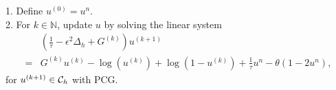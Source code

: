 \begin{algorithm}[!t]
    \caption{Iterative solver based on high-dimensional Newton's method}
\label{alg:Newton}
    \raggedright
    1. Define $u^{(0)}=u^n$.\\
    2. For $k\in\mathbb{N}$, update $u$ by solving the linear system
    \begin{equation}
\begin{aligned}
    &(\frac{1}{\tau}-\epsilon^2\Delta_h+G^{(k)})u^{(k+1)}\\
    =&G^{(k)}u^{(k)}
    -\log(u^{(k)})
    +\log(1-u^{(k)})
    +\frac{1}{\tau}u^n-\theta(1-2u^n),
\end{aligned}
\end{equation}
    \hspace{10pt} for $u^{(k+1)}\in{\mathcal{C}_h}$ with PCG.\\
    
\end{algorithm}

\fi